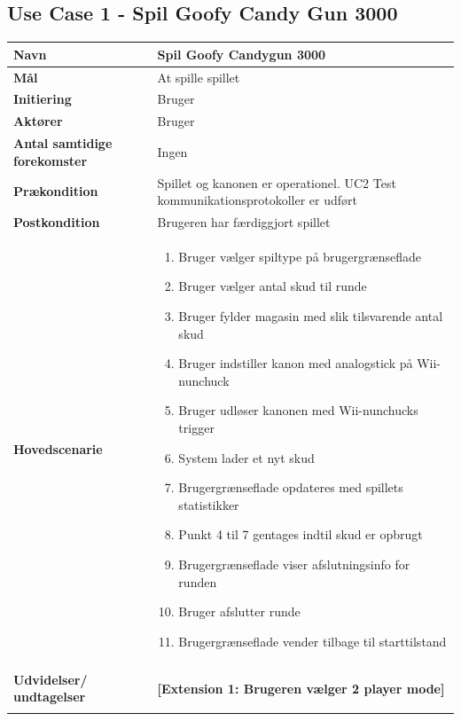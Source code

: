 \subsection{Use Case 1 - Spil Goofy Candy Gun 3000}
\begin{tabular}{|>{\hspace{0pt}}p{3cm}  |>{\hspace{0pt}}p{9cm}|}
	\hline
	\textbf{Navn} & Spil Goofy Candygun 3000\\ \hline
	\textbf{Mål} & At spille spillet\\ \hline
	\textbf{Initiering} & Bruger\\ \hline
	\textbf{Aktører} & Bruger\\ \hline
	\textbf{Antal samtidige forekomster} & Ingen \\ \hline
	\textbf{Prækondition} & Spillet og kanonen er operationel. UC2 Test kommunikationsprotokoller er udført \\ \hline
	\textbf{Postkondition} &  Brugeren har færdiggjort spillet \\ \hline
	\textbf{Hovedscenarie} & \begin{enumerate}
		\item Bruger vælger spiltype på brugergrænseflade
		\item Bruger vælger antal skud til runde
		\item Bruger fylder magasin med slik tilsvarende antal skud
		\item Bruger indstiller kanon med analogstick på Wii-nunchuck
		\item Bruger udløser kanonen med Wii-nunchucks trigger
		\item System lader et nyt skud
		\item Brugergrænseflade opdateres med spillets statistikker
		\item Punkt 4 til 7 gentages indtil skud er opbrugt 
		\subitem [Extension 1: Bruger vælger 2 player mode] 
		\subitem[Extension 2: Bruger afslutter det igangværende spil]
		\item Brugergrænseflade viser afslutningsinfo for runden
		\item Bruger afslutter runde
		\item Brugergrænseflade vender tilbage til starttilstand
	\end{enumerate}\\ \hline
	\textbf{Udvidelser/ undtagelser} & \textbf{[Extension 1: Brugeren vælger 2 player mode]} \newline \begin{enumerate} 

\end{enumerate}
\end{tabular}
